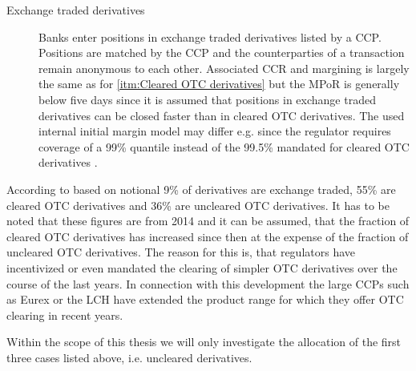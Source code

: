 \documentclass[../Thesis_AHoecherl.tex]{subfiles}
\begin{document}
\begin{description}
    \item[Exchange traded derivatives\label{itm:Exchange traded derivatives}] 
    Banks enter positions in exchange traded derivatives listed by a \gls{CCP}. Positions are matched by the \gls{CCP} and the counterparties of a transaction remain anonymous to each other. Associated \gls{CCR} and margining is largely the same as for \ref{itm:Cleared OTC derivatives} but the \gls{MPoR} is generally below five days since it is assumed that positions in exchange traded derivatives can be closed faster than in cleared \gls{OTC} derivatives. The used internal initial margin model may differ e.g. since the regulator requires coverage of a 99\% quantile instead of the 99.5\% mandated for cleared \gls{OTC} derivatives \cite[Article 24]{CCP_margining_regulation}.
\end{description}

According to \cite[Figure~3.2]{gregory2015xva} based on notional 9\% of derivatives are exchange traded, 55\% are cleared \gls{OTC} derivatives and 36\% are uncleared \gls{OTC} derivatives. It has to be noted that these figures are from 2014 and it can be assumed, that the fraction of cleared \gls{OTC} derivatives has increased since then at the expense of the fraction of uncleared \gls{OTC} derivatives. The reason for this is, that regulators have incentivized or even mandated the clearing of simpler \gls{OTC} derivatives over the course of the last years. In connection with this development the large \glspl{CCP} such as Eurex or the LCH have extended the product range for which they offer \gls{OTC} clearing in recent years.

Within the scope of this thesis we will only investigate the allocation of the first three cases listed above, i.e. uncleared derivatives.
\end{document}
